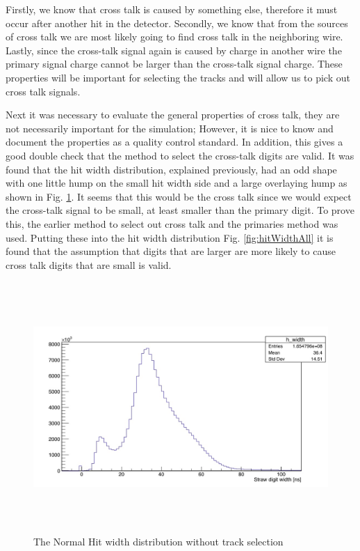 \documentclass[./Thesis]{subfiles}
\begin{document}
 Firstly, we know that cross talk is caused by something else, therefore it must occur after another hit in the detector.  Secondly, we know that from the sources of cross talk we are most likely going to find cross talk in the neighboring wire.  Lastly, since the cross-talk signal again is caused by charge in another wire the primary signal charge cannot be larger than the cross-talk signal charge.  These properties will be important for selecting the tracks and will allow us to pick out cross talk signals.
	
	Next it was necessary to evaluate the general properties of cross talk, they are not necessarily important for the simulation; However, it is nice to know and document the properties as a quality control standard.  In addition, this gives a good double check that the method to select the cross-talk digits are valid.  It was found that the hit width distribution, explained previously, had an odd shape with one little hump on the small hit width side and a large overlaying hump as shown in Fig. \ref{fig:hitWidth}. It seems that this would be the cross talk since we would expect the cross-talk signal to be small, at least smaller than the primary digit.  To prove this, the earlier method to select out cross talk and the primaries method was used.  Putting these into the hit width distribution Fig. \ref{fig:hitWidthAll} it is found that the assumption that digits that are larger are more likely to cause cross talk digits that are small is valid.
	
\begin{figure}
	\centerline{\includegraphics[height=95mm]{NormalHitWidth.jpeg}}
	\caption[ HitWidth]{ The Normal Hit width distribution without track selection}
	\label{fig:hitWidth}
\end{figure}
\end{document}
